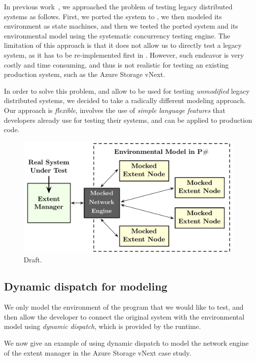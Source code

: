 In previous work~\cite{deligiannis2015psharp}, we approached the problem of testing legacy distributed systems as follows. First, we ported the system to \psharp, we then modeled its environment as \psharp state machines, and then we tested the ported system and its environmental model using the \psharp systematic concurrency testing engine. The limitation of this approach is that it does not allow us to directly test a legacy system, as it has to be re-implemented first in \psharp. However, such endeavor is very costly and time consuming, and thus is not realistic for testing an existing production system, such as the Azure Storage vNext.

In order to solve this problem, and allow \psharp to be used for testing \emph{unmodified} legacy distributed systems, we decided to take a radically different modeling approach. Our approach is \emph{flexible}, involves the use of \emph{simple language features} that developers already use for testing their systems, and can be applied to production code.

\begin{figure}[t]
\centering
\includegraphics[width=\linewidth]{img/mocked_engine}
\caption{Draft.}
\label{fig:azurestoremodel}
\end{figure}

\subsection{Dynamic dispatch for modeling}
\label{sec:method:dd}

We only model the environment of the program that we would like to test, and then allow the developer to connect the original system with the environmental model using \emph{dynamic dispatch}, which is provided by the \csharp runtime.

We now give an example of using dynamic dispatch to model the network engine of the extent manager in the Azure Storage vNext case study.


